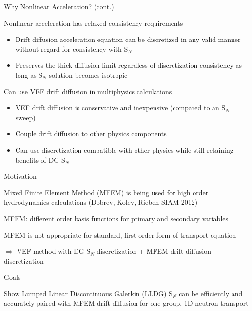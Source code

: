 \documentclass[10pt]{beamer}
\newcommand{\SN}{S$_N$\xspace}
\begin{document}
\begin{frame}{Why Nonlinear Acceleration? (cont.)}


		Nonlinear acceleration has relaxed consistency requirements 
		\begin{itemize}
			\item Drift diffusion acceleration equation can be discretized in any valid manner without regard for consistency with \SN  

			\item Preserves the thick diffusion limit regardless of discretization consistency as long as \SN solution becomes isotropic 
		\end{itemize}

		Can use VEF drift diffusion in multiphysics calculations  
		\begin{itemize}

			\item VEF drift diffusion is conservative and inexpensive (compared to an \SN sweep) 

			\item Couple drift diffusion to other physics components 

			\item Can use discretization compatible with other physics while still retaining benefits of DG \SN 

		\end{itemize}


\end{frame}

\begin{frame}{Motivation}


		Mixed Finite Element Method (MFEM) is being used for high order hydrodynamics calculations (Dobrev, Kolev, Rieben SIAM 2012)

		MFEM: different order basis functions for primary and secondary variables 

		MFEM is not appropriate for standard, first-order form of transport equation 

		$\Rightarrow$ VEF method with DG \SN discretization + MFEM drift diffusion discretization 


	\vfill
	\begin{alertblock}{Goals}
		
		Show Lumped Linear Discontinuous Galerkin (LLDG) \SN can be efficiently and accurately paired with MFEM drift diffusion for one group, 1D neutron transport 

	\end{alertblock}

\end{frame}
\end{document}
